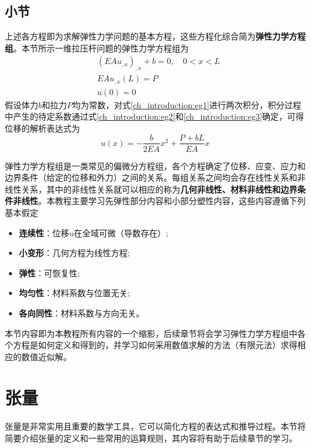 \subsection{小节}
上述各方程即为求解弹性力学问题的基本方程，这些方程化综合简为\textbf{弹性力学方程组}。本节所示一维拉压杆问题的弹性力学方程组为
\begin{subequations}\label{ch_introduction:strong}
    \begin{align}
        &(EAu_{,x})_{,x} + b = 0, \quad 0<x<L\label{ch_introduction:eg1} \\
        &EAu_{,x}(L) = P\label{ch_introduction:eg2} \\
        &u(0) = 0\label{ch_introduction:eg3}
    \end{align}
\end{subequations}
假设体力$b$和拉力$P$均为常数，对式\eqref{ch_introduction:eg1}进行两次积分，积分过程中产生的待定系数通过式\eqref{ch_introduction:eg2}和\eqref{ch_introduction:eg3}确定，可得位移的解析表达式为
\begin{equation}\label{ch_introduction:ext}
    u(x) = - \frac{b}{2EA} x^2 + \frac{P+bL}{EA}x
\end{equation}
\par
弹性力学方程组是一类常见的偏微分方程组，各个方程确定了位移、应变、应力和边界条件（给定的位移和外力）之间的关系。每组关系之间均会存在线性关系和非线性关系，其中的非线性关系就可以相应的称为\textbf{几何非线性、材料非线性和边界条件非线性}。本教程主要学习先弹性部分内容和小部分塑性内容，这些内容遵循下列基本假定
\begin{itemize}
    \item \textbf{连续性}：位移$u$在全域可微（导数存在）;
    \item \textbf{小变形}：几何方程为线性方程;
    \item \textbf{弹性}：可恢复性;
    \item \textbf{均匀性}：材料系数与位置无关;
    \item \textbf{各向同性}：材料系数与方向无关。
\end{itemize} \par
本节内容即为本教程所有内容的一个缩影，后续章节将会学习弹性力学方程组中各个方程是如何定义和得到的，并学习如何采用数值求解的方法（有限元法）求得相应的数值近似解。

\section{张量}
张量是非常实用且重要的数学工具，它可以简化方程的表达式和推导过程。本节将简要介绍张量的定义和一些常用的运算规则，其内容将有助于后续章节的学习。

